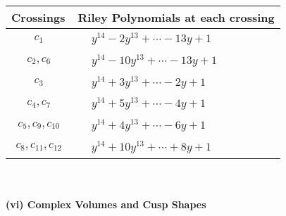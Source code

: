 \documentclass[1p]{elsarticle_modified}
\theoremstyle{definition}
\begin{document}
\begin{tabular}{m{50pt}|m{274pt}}
Crossings & \hspace{64pt}Riley Polynomials at each crossing \\
\hline $$\begin{aligned}c_{1}\end{aligned}$$&$\begin{aligned}
&y^{14}-2 y^{13}+\cdots-13 y+1
\end{aligned}$\\
\hline $$\begin{aligned}c_{2},c_{6}\end{aligned}$$&$\begin{aligned}
&y^{14}-10 y^{13}+\cdots-13 y+1
\end{aligned}$\\
\hline $$\begin{aligned}c_{3}\end{aligned}$$&$\begin{aligned}
&y^{14}+3 y^{13}+\cdots-2 y+1
\end{aligned}$\\
\hline $$\begin{aligned}c_{4},c_{7}\end{aligned}$$&$\begin{aligned}
&y^{14}+5 y^{13}+\cdots-4 y+1
\end{aligned}$\\
\hline $$\begin{aligned}c_{5},c_{9},c_{10}\end{aligned}$$&$\begin{aligned}
&y^{14}+4 y^{13}+\cdots-6 y+1
\end{aligned}$\\
\hline $$\begin{aligned}c_{8},c_{11},c_{12}\end{aligned}$$&$\begin{aligned}
&y^{14}+10 y^{13}+\cdots+8 y+1
\end{aligned}$\\
\hline
\end{tabular}\\~\\
\newpage\flushleft \textbf{(vi) Complex Volumes and Cusp Shapes}
\end{document}
